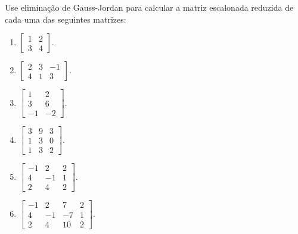\begin{question}
  Use eliminação de Gauss-Jordan para calcular a matriz escalonada reduzida de cada uma das seguintes matrizes:
  \begin{multicols}{3}
    \begin{enumerate}[label=\alph*)]
      \item $\begin{bmatrix}
                1 & 2 \\ 3 & 4
              \end{bmatrix}$.
      \item $\begin{bmatrix}
                2 & 3 & -1 \\ 4 & 1 & 3
              \end{bmatrix}$.
      \item $\begin{bmatrix}
                1 & 2 \\ 3 & 6 \\ -1 & -2
              \end{bmatrix}$.
      \item $\begin{bmatrix}
                3 & 9 & 3 \\ 1 & 3 & 0 \\ 1 & 3 & 2
              \end{bmatrix}$.
      \item $\begin{bmatrix}
                -1 & 2 & 2 \\ 4 & -1 & 1 \\ 2 & 4 & 2
              \end{bmatrix}$.
      \item $\begin{bmatrix}
                -1 & 2  & 7  & 2 \\
                4  & -1 & -7 & 1 \\
                2  & 4  & 10 & 2
              \end{bmatrix}$.
    \end{enumerate}
  \end{multicols}
  \vspace{8pt}
\end{question}

